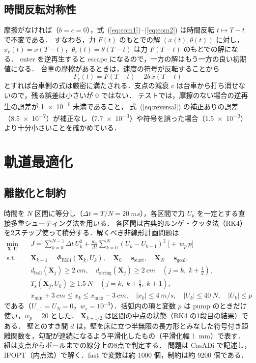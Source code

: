 \documentclass[a4paper,10pt]{ltjsarticle}
\newcommand{\eqnref}[1]{式~(\ref{#1})}
\begin{document}
\subsection{時間反転対称性}
\label{sec:reversal}

摩擦がなければ（$b=c=0$），\eqnref{eq:eom1}--(\ref{eq:eom2}) は時間反転 $t \mapsto T-t$ で不変である．
すなわち，力 $F(t)$ のもとでの解 $(x(t), \theta(t))$ に対し，$x_r(t) = x(T-t)$，$\theta_r(t) = \theta(T-t)$ は力 $F(T-t)$ のもとでの解になる．
enter を逆再生すると escape になるので，一方の解はもう一方の良い初期値になる．
台車の摩擦があるときは，速度の符号が反転することから
\begin{equation}
  F_r(t) = F(T-t) - 2b\,\dot x(T-t) \label{eq:reversal}
\end{equation}
とすれば台車側の式は厳密に満たされる．支点の減衰 $c$ は台車から打ち消せないので，残る誤差は小さいが 0 ではない．
テストでは，摩擦のない場合の逆再生の誤差が \num{1e-6} 未満であること，
\eqnref{eq:reversal} の補正ありの誤差（\num{8.5e-7}）が補正なし（\num{7.7e-3}）や符号を誤った場合（\num{1.5e-2}）より十分小さいことを確かめている．

\section{軌道最適化}

\subsection{離散化と制約}

時間を $N$ 区間に等分し（$\Delta t = T/N = \SI{20}{ms}$），各区間で力 $U_k$ を一定とする直接多重シューティング法\cite{bock1984,betts2010}を用いる．
各区間は古典的ルンゲ・クッタ法（RK4）を2ステップ使って積分する．解くべき非線形計画問題は
\begin{align}
  \min_{\bm X, \bm U}\quad & J = \sum_{k=0}^{N-1} \Delta t\, U_k^2 + \frac{w_s}{\Delta t}\sum_{k=0}^{N} (U_k - U_{k-1})^2 \;\bigl[+\, w_p\,p\bigr] \label{eq:nlp}\\
  \text{s.t.}\quad & \bm X_{k+1} = \Phi_{\mathrm{RK4}}(\bm X_k, U_k),\quad \bm X_0 = \bm s_{\mathrm{start}},\quad \bm X_N = \bm s_{\mathrm{goal}}, \nonumber\\
  & d_{\mathrm{ball}}(\bm X_j) \ge \SI{2}{cm},\quad d_{\mathrm{string}}(\bm X_j) \ge \SI{2}{cm} \quad (j = k,\; k+\tfrac12), \nonumber\\
  & T_{\mathrm s}(\bm X_j, U_k) \ge \SI{1.5}{N} \quad (j = k,\; k+\tfrac12,\; k+1), \nonumber\\
  & x_{\min} + \SI{3}{cm} \le x_k \le x_{\max} - \SI{3}{cm},\quad |\dot x_k| \le \SI{4}{m/s},\quad |U_k| \le \SI{40}{N},\quad |U_k| \le p \nonumber
\end{align}
である（$U_{-1} = U_N = 0$，$w_s = 10^{-3}$）．括弧内の項と変数 $p$ は pump のときだけ使い，$w_p = 20$ とした．
$\bm X_{k+1/2}$ は区間の中点の状態（RK4 の1段目の結果）である．
壁とのすき間 $d$ は，壁を床に立つ半無限の長方形とみなした符号付き距離関数を，勾配が連続になるよう平滑化したもの（平滑化幅 \SI{1}{mm}）で表す．
紐は支点からボールまでの線分上の8点で判定する．
問題は CasADi\cite{casadi} で記述し，IPOPT\cite{ipopt}（内点法）で解く．fast で変数は約 1000 個，制約は約 9200 個である．
\end{document}

